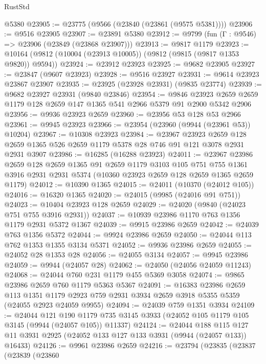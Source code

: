 \begin{lexlean}{RustStd}
\begin{coremodule}
    @5380
@23905 := @23775 (@9566 (@23840 (@23861 (@9575 @5381))))
@23906 := @9516 @23905
@23907 := @23891 @5380
@23912 := @9799 (fun (Γ : @9546) => @23906 (@23849 (@23868 @23907)))
@23913 := @9817 @1179
@23923 := @10164 (@9812 (@10004 (@23913 @10005)) (@9812 (@9815 (@9817 @1353 @9820)) @9594))
@23924 := @23912 @23923
@23925 := @9682 @23905
@23927 := @23847 (@9607 @23923)
@23928 := @9516 @23927
@23931 := @9614 @23923 @23867 @23907
@23935 := @23925 (@23928 @23931) (@9835 @23774)
@23939 := @9682 @23927 @23931 (@9840 @23846)
@23954 := @9846
    @23923
    @2659
    @2659
    @1179
    @128
    @2659
    @147
    @1365
    @541
    @2966
    @5379
    @91
    @2900
    @5342
    @2906
@23956 := @9936 @23923 @2659
@23960 := @23956 @53 @128 @53 @2966
@23961 := @9945 @23923
@23966 := @23954 (@23960 (@9944 (@23961 @53)) @10204)
@23967 := @10308 @23923
@23984 := @23967
    @23923
    @2659
    @128
    @2659
    @1365
    @526
    @2659
    @1179
    @5378
    @28
    @746
    @91
    @121
    @3078
    @2931
    @2931
    @3907
@23986 := @16285 (@16288 @23923)
@24011 := @23967
    @23986
    @2659
    @128
    @2659
    @1365
    @91
    @2659
    @1179
    @3103
    @105
    @751
    @755
    @1361
    @3916
    @2931
    @2931
    @5374
    (@10360 @23923 @2659 @128 @2659 @1365 @2659 @1179)
@24012 := @10390 @1365
@24015 := @24011 (@10370 (@24012 @105))
@24016 := @16320 @1365
@24020 := @24015 (@9985 (@24016 @91 @751))
@24023 := @10404 @23923 @128 @2659
@24029 := @24020 (@9840 (@24023 @751 @755 @3916 @2931))
@24037 := @10939 @23986 @1170 @763 @1356 @1179 @2931 @5372 @1367
@24039 := @9915 @23986 @2659
@24042 := @24039 @763 @1356 @5372
@24044 := @9924 @23986 @2659
@24050 := @24044 @113 @762 @1353 @1355 @3134 @5371
@24052 := @9936 @23986 @2659
@24055 := @24052 @28 @1353 @28
@24056 := @24055 @3134
@24057 := @9945 @23986
@24059 := @9944 (@24057 @28)
@24062 := @24050 (@24056 @24059 @11243)
@24068 := @24044 @760 @231 @1179 @455 @5369 @3058
@24074 := @9865 @23986 @2659 @760 @1179 @5363 @5367
@24091 := @16383
    @23986
    @2659
    @113
    @1351
    @1179
    @2923
    @759
    @2931
    @3934
    @2659
    @3918
    @5355
    @5359
    (@24055 @2923 @24059 @9955)
@24094 := @24039 @759 @1351 @3934
@24109 := @24044
    @121
    @190
    @1179
    @735
    @3145
    @3933
    (@24052 @105 @1179 @105 @3145 (@9944 (@24057 @105)) @11337)
@24124 := @24044
    @188
    @115
    @127
    @11
    @3931
    @2925
    (@24052 @133 @127 @133 @3931 (@9944 (@24057 @133)) @16433)
@24126 := @9961 @23986 @2659
@24216 := @23794
    (@23835
      (@23837
        (@23839
          (@23860

\end{coremodule}
\end{lexlean}
